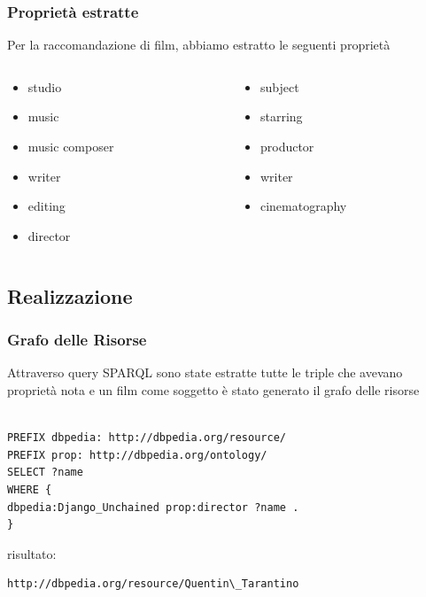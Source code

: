 \documentclass{beamer}
\begin{document}
\begin{frame}
\frametitle{Proprietà estratte}
Per la raccomandazione di film, abbiamo estratto le seguenti proprietà
\begin{columns}
\begin{column}{0.5\textwidth}
\begin{itemize}
\item studio
\item music
\item music composer
\item writer
\item editing
\item director
\end{itemize}
\end{column}
\begin{column}{0.5\textwidth}
\begin{itemize}
\item subject
\item starring
\item productor
\item writer
\item cinematography
\end{itemize}
\end{column}
\end{columns}
\end{frame}


\subsection{Realizzazione}


\begin{frame}[fragile]
\frametitle{Grafo delle Risorse}
Attraverso query SPARQL sono state estratte tutte le triple che avevano proprietà nota e un film come soggetto
è stato generato il grafo delle risorse \\~\\
\begin{lstlisting}[language=customized]
PREFIX dbpedia: http://dbpedia.org/resource/
PREFIX prop: http://dbpedia.org/ontology/
SELECT ?name
WHERE {
dbpedia:Django_Unchained prop:director ?name .
}
\end{lstlisting}
risultato:

\begin{lstlisting}[language=customized]
http://dbpedia.org/resource/Quentin\_Tarantino
\end{lstlisting}
\end{frame}
\end{document}
